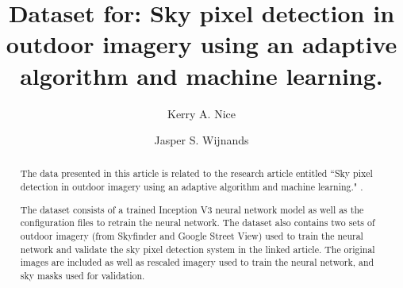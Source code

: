 \documentclass[final,3p,times,authoryear]{elsarticle}
\begin{document}
\begin{frontmatter}



\title{Dataset for: Sky pixel detection in outdoor imagery using an adaptive algorithm and machine learning.} 

\author[melb]{Kerry A. Nice}
\author[melb]{Jasper S. Wijnands}
\address[melb]{Transport, Health and Urban Design, Melbourne School of Design, The University of Melbourne, Parkville VIC 3010, Australia}





\begin{abstract}

The data presented in this article is related to the research article entitled ``Sky pixel detection in outdoor imagery using an adaptive algorithm and machine learning." \citep{Nice2019UC}. 

The dataset consists of a trained Inception V3 neural network model as well as the configuration files to retrain the neural network. The dataset also contains two sets of outdoor imagery (from Skyfinder and Google Street View) used to train the neural network and validate the sky pixel detection system in the linked article. The original images are included as well as rescaled imagery used to train the neural network, and sky masks used for validation.






\end{abstract}
\end{frontmatter}
\end{document}
